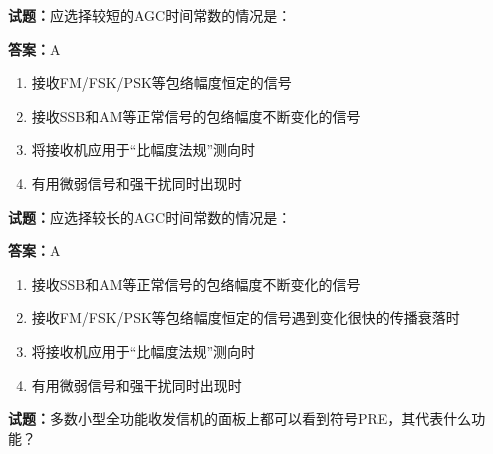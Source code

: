 \documentclass{ctexbook}
\begin{document}





\vspace{1em}

\textbf{试题：}应选择较短的AGC时间常数的情况是： 

\textbf{答案：}A 

\begin{enumerate}[leftmargin=3em]
  \item 接收FM/FSK/PSK等包络幅度恒定的信号 

  \item 接收SSB和AM等正常信号的包络幅度不断变化的信号 

  \item 将接收机应用于“比幅度法规”测向时 

  \item 有用微弱信号和强干扰同时出现时 

\end{enumerate}





\vspace{1em}

\textbf{试题：}应选择较长的AGC时间常数的情况是： 

\textbf{答案：}A 

\begin{enumerate}[leftmargin=3em]
  \item 接收SSB和AM等正常信号的包络幅度不断变化的信号 

  \item 接收FM/FSK/PSK等包络幅度恒定的信号遇到变化很快的传播衰落时 

  \item 将接收机应用于“比幅度法规”测向时 

  \item 有用微弱信号和强干扰同时出现时 

\end{enumerate}





\vspace{1em}

\textbf{试题：}多数小型全功能收发信机的面板上都可以看到符号PRE，其代表什么功能？ 
\end{document}

